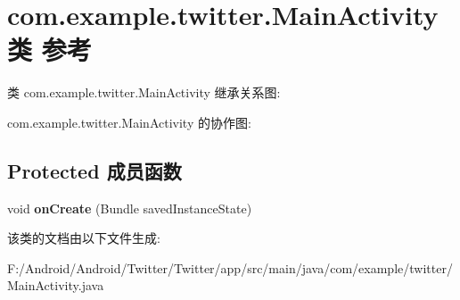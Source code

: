 \hypertarget{classcom_1_1example_1_1twitter_1_1_main_activity}{}\section{com.\+example.\+twitter.\+Main\+Activity类 参考}
\label{classcom_1_1example_1_1twitter_1_1_main_activity}


类 com.\+example.\+twitter.\+Main\+Activity 继承关系图\+:


com.\+example.\+twitter.\+Main\+Activity 的协作图\+:
\subsection*{Protected 成员函数}
\begin{DoxyCompactItemize}
\item 
\mbox{\label{classcom_1_1example_1_1twitter_1_1_main_activity_ab8d9c0a6cfaae62968f94b931ddc8ef2}} 
void {\bfseries on\+Create} (Bundle saved\+Instance\+State)
\end{DoxyCompactItemize}


该类的文档由以下文件生成\+:\begin{DoxyCompactItemize}
\item 
F\+:/\+Android/\+Android/\+Twitter/\+Twitter/app/src/main/java/com/example/twitter/Main\+Activity.\+java\end{DoxyCompactItemize}
